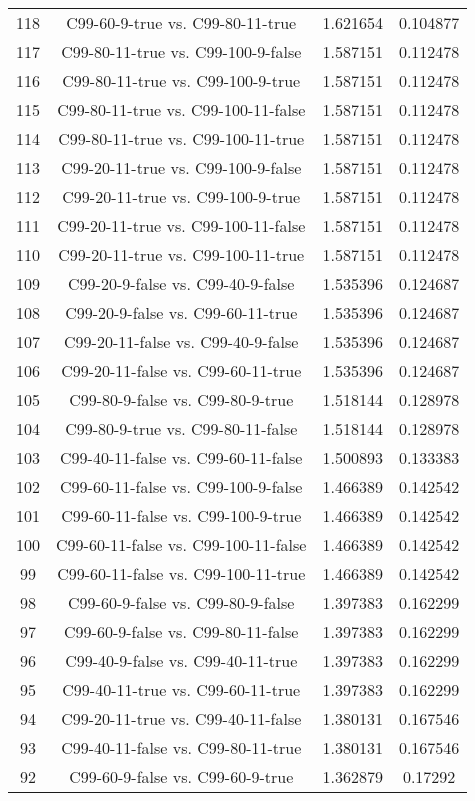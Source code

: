 \documentclass[a4paper,10pt]{article}
\begin{document}
\begin{landscape}
\begin{table}[!htp]
\begin{tabular}{cccc}
118&C99-60-9-true vs. C99-80-11-true&1.621654&0.104877\\
117&C99-80-11-true vs. C99-100-9-false&1.587151&0.112478\\
116&C99-80-11-true vs. C99-100-9-true&1.587151&0.112478\\
115&C99-80-11-true vs. C99-100-11-false&1.587151&0.112478\\
114&C99-80-11-true vs. C99-100-11-true&1.587151&0.112478\\
113&C99-20-11-true vs. C99-100-9-false&1.587151&0.112478\\
112&C99-20-11-true vs. C99-100-9-true&1.587151&0.112478\\
111&C99-20-11-true vs. C99-100-11-false&1.587151&0.112478\\
110&C99-20-11-true vs. C99-100-11-true&1.587151&0.112478\\
109&C99-20-9-false vs. C99-40-9-false&1.535396&0.124687\\
108&C99-20-9-false vs. C99-60-11-true&1.535396&0.124687\\
107&C99-20-11-false vs. C99-40-9-false&1.535396&0.124687\\
106&C99-20-11-false vs. C99-60-11-true&1.535396&0.124687\\
105&C99-80-9-false vs. C99-80-9-true&1.518144&0.128978\\
104&C99-80-9-true vs. C99-80-11-false&1.518144&0.128978\\
103&C99-40-11-false vs. C99-60-11-false&1.500893&0.133383\\
102&C99-60-11-false vs. C99-100-9-false&1.466389&0.142542\\
101&C99-60-11-false vs. C99-100-9-true&1.466389&0.142542\\
100&C99-60-11-false vs. C99-100-11-false&1.466389&0.142542\\
99&C99-60-11-false vs. C99-100-11-true&1.466389&0.142542\\
98&C99-60-9-false vs. C99-80-9-false&1.397383&0.162299\\
97&C99-60-9-false vs. C99-80-11-false&1.397383&0.162299\\
96&C99-40-9-false vs. C99-40-11-true&1.397383&0.162299\\
95&C99-40-11-true vs. C99-60-11-true&1.397383&0.162299\\
94&C99-20-11-true vs. C99-40-11-false&1.380131&0.167546\\
93&C99-40-11-false vs. C99-80-11-true&1.380131&0.167546\\
92&C99-60-9-false vs. C99-60-9-true&1.362879&0.17292\\

\end{tabular}
\end{table}
\end{landscape}
\end{document}
